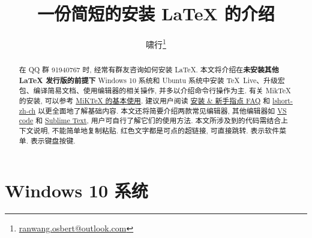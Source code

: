 \documentclass{ctexrep}
\title{\bfseries 一份简短的安装 \LaTeX{} 的介绍}
\author{啸行\thanks{\url{ranwang.osbert@outlook.com}}}
\begin{document}
  
\maketitle

\begin{abstract}
在 QQ 群 91940767 时, 经常有群友咨询如何安装 \LaTeX.
本文将介绍在\textbf{未安装其他 \LaTeX{} 发行版的前提下} Windows 10 系统和 Ubuntu 系统中安装 \TeX{}~Live、升级宏包、编译简易文档、使用编辑器的相关操作, 并多以介绍命令行操作为主.
有关 Mik\TeX{} 的安装, 可以参考 \href{https://camuseblog.top/2019-03-02-/MiKTeX/}{MiK\TeX{} 的基本使用}.
建议用户阅读 \href{http://www.latexstudio.net/archives/11469.html}{\LaTeXe{} 安装 \& 新手指点 FAQ} 和 \href{http://mirrors.ctan.org/info/lshort/chinese/lshort-zh-cn.pdf}{lshort-zh-ch} 以更全面地了解基础内容.
本文还将简要介绍两款常见编辑器, 其他编辑器如 \href{https://github.com/EthanDeng/vscode-latex}{VS code} 和 \href{https://github.com/EthanDeng/sublime-text-latex}{Sublime Text}, 用户可自行了解它们的使用方法.
本文所涉及到的代码需结合上下文说明, 不能简单地复制粘贴.
红色文字都是可点的超链接, 可直接跳转.
 表示软件菜单.
 表示键盘按键.
\end{abstract}

\tableofcontents

\chapter{Windows 10 系统}
\end{document}
